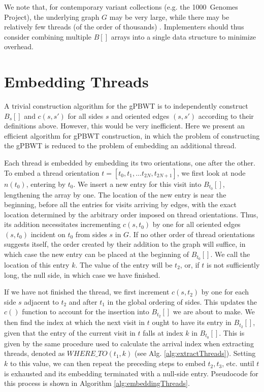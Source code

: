 We note that, for contemporary variant collections (e.g. the 1000~Genomes Project), the underlying graph $G$ may be very large, while there may be relatively few threads (of the order of thousands) \cite{10002015global}. Implementers should thus consider combining multiple $B[]$ arrays into a single data structure to minimize overhead.

\section{Embedding Threads}

A trivial construction algorithm for the gPBWT is to independently construct $B_s[]$ and $c(s, s')$ for all sides $s$ and oriented edges $(s, s')$ according to their definitions above. However, this would be very inefficient. Here we present an efficient algorithm for gPBWT construction, in which the problem of constructing the gPBWT is reduced to the problem of embedding an additional thread.

Each thread is embedded by embedding its two orientations, one after the other. To embed a thread orientation $t = [t_0, t_1, \ldots t_{2N}, t_{2N+1}]$, we first look at node $n(t_0)$, entering by $t_0$. We insert a new entry for this visit into $B_{t_0}[]$, lengthening the array by one. The location of the new entry is near the beginning, before all the entries for visits arriving by edges, with the exact location determined by the arbitrary order imposed on thread orientations. Thus, its addition necessitates incrementing $c(s, t_0)$ by one for all oriented edges $(s, t_0)$ incident on $t_0$ from sides $s$ in $G$. If no other order of thread orientations suggests itself, the order created by their addition to the graph will suffice, in which case the new entry can be placed at the beginning of $B_{t_0}[]$. We call the location of this entry $k$. The value of the entry will be $t_2$, or, if $t$ is not sufficiently long, the null side, in which case we have finished. 

If we have not finished the thread, we first increment $c(s, t_2)$ by one for each side $s$ adjacent to $t_2$ and after $t_1$ in the global ordering of sides. This updates the $c()$ function to account for the insertion into $B_{t_2}[]$ we are about to make.
We then find the index at which the next visit in $t$ ought to have its entry in $B_{t_{2}}[]$, given that the entry of the current visit in $t$ falls at index $k$ in $B_{t_{0}}[]$. This is given by the same procedure used to calculate the arrival index when extracting threads, denoted as $WHERE\_TO(t_1, k)$ (see Alg. \ref{alg:extractThreads}). Setting $k$ to this value, we can then repeat the preceding steps to embed $t_2, t_3$, etc. until $t$ is exhausted and its embedding terminated with a null-side entry. Pseudocode for this process is shown in Algorithm \ref{alg:embeddingThreads}.

